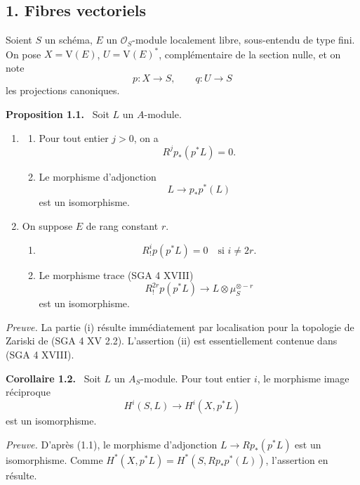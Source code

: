 \documentclass[11pt]{article}
\newenvironment{statement}[1]{\par\medskip\noindent\textbf{#1.}\ }{\par\medskip}
\providecommand{\V}{\mathrm V}
\begin{document}
\subsection*{1. Fibres vectoriels}

Soient $S$ un schéma, $E$ un $\mathcal O_S$-module localement libre, sous-entendu de type fini. On pose $X=\V(E)$, $U=\V(E)^*$, complémentaire de la section nulle, et on note
\[
p:X\to S,
\qquad
q:U\to S
\]
les projections canoniques.

\begin{statement}{Proposition 1.1}
Soit $L$ un $A$-module.
\begin{enumerate}[label=(\roman*)]
\item
\begin{enumerate}[label=\alph*)]
\item Pour tout entier $j>0$, on a
\[
R^j p_*(p^*L)=0.
\]
\item Le morphisme d'adjonction
\[
L\longrightarrow p_*p^*(L)
\]
est un isomorphisme.
\end{enumerate}
\item On suppose $E$ de rang constant $r$.
\begin{enumerate}[label=\alph*)]
\item
\[
R_!^i p(p^*L)=0\quad\text{si }i\ne 2r.
\]
\item Le morphisme trace (SGA 4 XVIII)
\[
R_!^{2r}p(p^*L)\longrightarrow L\otimes\mu_S^{\otimes -r}
\]
est un isomorphisme.
\end{enumerate}
\end{enumerate}
\end{statement}

\emph{Preuve.} La partie (i) résulte immédiatement par localisation pour la topologie de Zariski de (SGA 4 XV 2.2). L'assertion (ii) est essentiellement contenue dans (SGA 4 XVIII).

\begin{statement}{Corollaire 1.2}
Soit $L$ un $A_S$-module. Pour tout entier $i$, le morphisme image réciproque
\[
H^i(S,L)\longrightarrow H^i(X,p^*L)
\]
est un isomorphisme.
\end{statement}

\emph{Preuve.} D'après (1.1), le morphisme d'adjonction $L\to Rp_*(p^*L)$ est un isomorphisme. Comme $H^*(X,p^*L)=H^*(S,Rp_*p^*(L))$, l'assertion en résulte.
\end{document}
